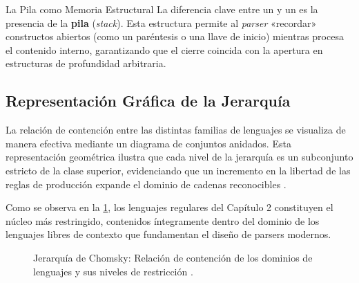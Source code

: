 \begin{observacion}{La Pila como Memoria Estructural}
La diferencia clave entre un  y un  es la presencia de la \textbf{pila} (\textit{stack}). Esta estructura permite al \textit{parser} «recordar» constructos abiertos (como un paréntesis o una llave de inicio) mientras procesa el contenido interno, garantizando que el cierre coincida con la apertura en estructuras de profundidad arbitraria.
\end{observacion}

\subsection{Representación Gráfica de la Jerarquía}
\label{subsec:3_2_3_grafica}

La relación de contención entre las distintas familias de lenguajes se visualiza de manera efectiva mediante un diagrama de conjuntos anidados. Esta representación geométrica ilustra que cada nivel de la jerarquía es un subconjunto estricto de la clase superior, evidenciando que un incremento en la libertad de las reglas de producción expande el dominio de cadenas reconocibles \cite{sipser2012introduction, aho2006compilers}.

Como se observa en la \cref{fig:chomsky-hierarchy}, los lenguajes regulares del Capítulo 2 constituyen el núcleo más restringido, contenidos íntegramente dentro del dominio de los lenguajes libres de contexto que fundamentan el diseño de parsers modernos.

\begin{figure}[htbp]
  \centering
  \caption{Jerarquía de Chomsky: Relación de contención de los dominios de lenguajes y sus niveles de restricción \cite{sipser2012introduction, aho2006compilers}.}
  \label{fig:chomsky-hierarchy}
\end{figure}

